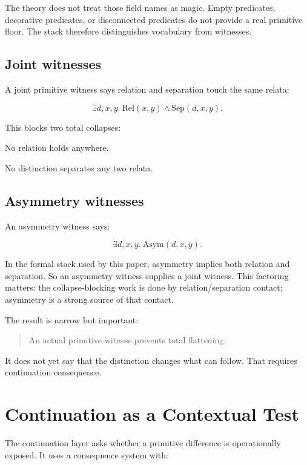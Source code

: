 \documentclass[11pt]{article}
\newcommand{\Rel}{\mathrm{Rel}}
\newcommand{\Sep}{\mathrm{Sep}}
\newcommand{\Asym}{\mathrm{Asym}}
\begin{document}
The theory does not treat those field names as magic. Empty predicates,
decorative predicates, or disconnected predicates do not provide a real
primitive floor. The stack therefore distinguishes vocabulary from witnesses.

\subsection{Joint witnesses}

A joint primitive witness says relation and separation touch the same relata:

\[
\exists d,x,y.\ \Rel(x,y) \wedge \Sep(d,x,y).
\]

This blocks two total collapses:

\begin{description}[leftmargin=*]
  \item[RelationCollapse] No relation holds anywhere.
  \item[IdentificationCollapse] No distinction separates any two relata.
\end{description}

\subsection{Asymmetry witnesses}

An asymmetry witness says:

\[
\exists d,x,y.\ \Asym(d,x,y).
\]

In the formal stack used by this paper, asymmetry implies both relation and
separation. So an asymmetry witness supplies a joint witness. This factoring
matters: the collapse-blocking work is done by relation/separation contact;
asymmetry is a strong source of that contact.

The result is narrow but important:

\begin{quote}
An actual primitive witness prevents total flattening.
\end{quote}

It does not yet say that the distinction changes what can follow. That requires
continuation consequence.

\section{Continuation as a Contextual Test}

The continuation layer asks whether a primitive difference is operationally
exposed. It uses a consequence system with:
\end{document}
